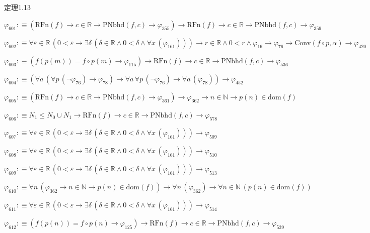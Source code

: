 \begin{fullproof}{定理1.13}
\begin{abbrevlist}
\item $\varphi_{601} :\equiv (\mathrm{RFn}(f) \to c \in \mathbb{R} \to \mathrm{PNbhd}(f,c) \to \varphi_{355}) \to \mathrm{RFn}(f) \to c \in \mathbb{R} \to \mathrm{PNbhd}(f,c) \to \varphi_{359}$
\item $\varphi_{602} :\equiv \forall \varepsilon \in \mathbb{R}\,(0 < \varepsilon \to \exists \delta\,(\delta \in \mathbb{R} \land 0 < \delta \land \forall x\,(\varphi_{161}))) \to r \in \mathbb{R} \land 0 < r \land \varphi_{16} \to \varphi_{76} \to \mathrm{Conv}(f \circ p,\alpha) \to \varphi_{420}$
\item $\varphi_{603} :\equiv (f(p(m)) = f \circ p(m) \to \varphi_{115}) \to \mathrm{RFn}(f) \to c \in \mathbb{R} \to \mathrm{PNbhd}(f,c) \to \varphi_{536}$
\item $\varphi_{604} :\equiv (\forall a\,(\forall p\,(\neg \varphi_{76}) \to \varphi_{78}) \to \forall a\,\forall p\,(\neg \varphi_{76}) \to \forall a\,(\varphi_{78})) \to \varphi_{452}$
\item $\varphi_{605} :\equiv (\mathrm{RFn}(f) \to c \in \mathbb{R} \to \mathrm{PNbhd}(f,c) \to \varphi_{361}) \to \varphi_{362} \to n \in \mathbb{N} \to p(n) \in \mathrm{dom}(f)$
\item $\varphi_{606} :\equiv N_{1} \leq N_{0} \cup N_{1} \to \mathrm{RFn}(f) \to c \in \mathbb{R} \to \mathrm{PNbhd}(f,c) \to \varphi_{578}$
\item $\varphi_{607} :\equiv \forall \varepsilon \in \mathbb{R}\,(0 < \varepsilon \to \exists \delta\,(\delta \in \mathbb{R} \land 0 < \delta \land \forall x\,(\varphi_{161}))) \to \varphi_{509}$
\item $\varphi_{608} :\equiv \forall \varepsilon \in \mathbb{R}\,(0 < \varepsilon \to \exists \delta\,(\delta \in \mathbb{R} \land 0 < \delta \land \forall x\,(\varphi_{161}))) \to \varphi_{510}$
\item $\varphi_{609} :\equiv \forall \varepsilon \in \mathbb{R}\,(0 < \varepsilon \to \exists \delta\,(\delta \in \mathbb{R} \land 0 < \delta \land \forall x\,(\varphi_{161}))) \to \varphi_{513}$
\item $\varphi_{610} :\equiv \forall n\,(\varphi_{362} \to n \in \mathbb{N} \to p(n) \in \mathrm{dom}(f)) \to \forall n\,(\varphi_{362}) \to \forall n \in \mathbb{N}\,(p(n) \in \mathrm{dom}(f))$
\item $\varphi_{611} :\equiv \forall \varepsilon \in \mathbb{R}\,(0 < \varepsilon \to \exists \delta\,(\delta \in \mathbb{R} \land 0 < \delta \land \forall x\,(\varphi_{161}))) \to \varphi_{514}$
\item $\varphi_{612} :\equiv (f(p(n)) = f \circ p(n) \to \varphi_{125}) \to \mathrm{RFn}(f) \to c \in \mathbb{R} \to \mathrm{PNbhd}(f,c) \to \varphi_{539}$

\end{abbrevlist}
\end{fullproof}
